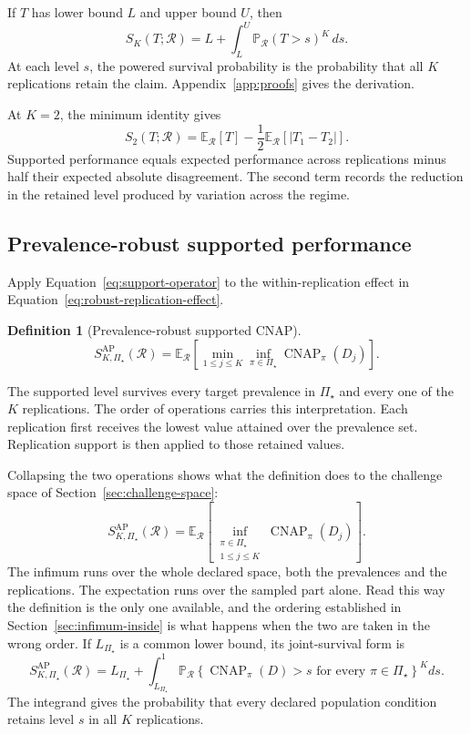 \documentclass[11pt]{article}
\newcommand{\CNAP}{\operatorname{CNAP}}
\newcommand{\Regime}{\mathcal{R}}
\newcommand{\PSet}{\Pi_\star}
\newcommand{\E}{\mathbb{E}}
\newcommand{\Prb}{\mathbb{P}}
\newcommand{\SRob}{S_{K,\PSet}^{\mathrm{AP}}(\Regime)}
\newtheorem{definition}{Definition}
\theoremstyle{remark}
\begin{document}
If $T$ has lower bound $L$ and upper bound $U$, then
\begin{equation}
S_K(T;\Regime)
=
L+\int_L^U
\Prb_{\Regime}(T>s)^K\,ds.
\label{eq:support-survival}
\end{equation}
At each level $s$, the powered survival probability is the probability that all $K$ replications retain the claim. Appendix~\ref{app:proofs} gives the derivation.

At $K=2$, the minimum identity gives
\begin{equation}
S_2(T;\Regime)
=
\E_{\Regime}[T]
-
\frac12
\E_{\Regime}
\left[
|T_1-T_2|
\right].
\label{eq:k2-decomposition}
\end{equation}
Supported performance equals expected performance across replications minus half their expected absolute disagreement. The second term records the reduction in the retained level produced by variation across the regime.

\subsection{Prevalence-robust supported performance}

Apply Equation~\eqref{eq:support-operator} to the within-replication effect in Equation~\eqref{eq:robust-replication-effect}.

\begin{definition}[Prevalence-robust supported CNAP]
\begin{equation}
\SRob
=
\E_{\Regime}
\left[
\min_{1\leq j\leq K}
\inf_{\pi\in\PSet}
\CNAP_\pi(D_j)
\right].
\label{eq:robust-support}
\end{equation}
\end{definition}

The supported level survives every target prevalence in $\PSet$ and every one of the $K$ replications. The order of operations carries this interpretation. Each replication first receives the lowest value attained over the prevalence set. Replication support is then applied to those retained values.

Collapsing the two operations shows what the definition does to the challenge space of Section~\ref{sec:challenge-space}:
\[
\SRob
=
\E_{\Regime}
\left[
\inf_{\substack{\pi\in\PSet\\1\leq j\leq K}}
\CNAP_\pi(D_j)
\right].
\]
The infimum runs over the whole declared space, both the prevalences and the replications. The expectation runs over the sampled part alone. Read this way the definition is the only one available, and the ordering established in Section~\ref{sec:infimum-inside} is what happens when the two are taken in the wrong order.
If $L_{\PSet}$ is a common lower bound, its joint-survival form is
\begin{equation}
\SRob
=
L_{\PSet}
+
\int_{L_{\PSet}}^1
\Prb_{\Regime}
\left\{
\CNAP_\pi(D)>s
\text{ for every }\pi\in\PSet
\right\}^{K}
ds.
\label{eq:robust-joint-survival}
\end{equation}
The integrand gives the probability that every declared population condition retains level $s$ in all $K$ replications.
\end{document}
